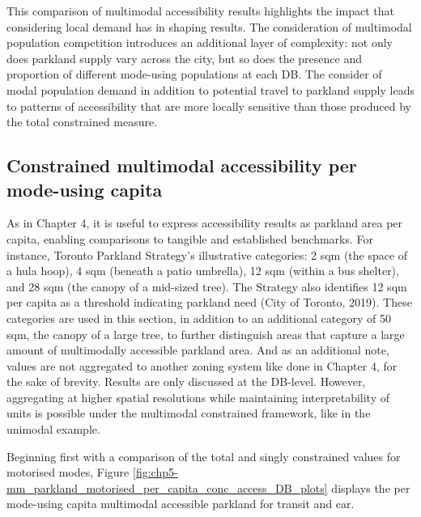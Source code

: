 \documentclass[
11pt, %
oneside, %
english, %
singlespacing, %
]{macthesis} %
\begin{document}
This comparison of multimodal accessibility results highlights the impact that considering local demand has in shaping results. The consideration of multimodal population competition introduces an additional layer of complexity: not only does parkland supply vary across the city, but so does the presence and proportion of different mode-using populations at each DB. The consider of modal population demand in addition to potential travel to parkland supply leads to patterns of accessibility that are more locally sensitive than those produced by the total constrained measure.

\subsection{Constrained multimodal accessibility per mode-using capita}\label{constrained-multimodal-accessibility-per-mode-using-capita}

As in Chapter 4, it is useful to express accessibility results as parkland area per capita, enabling comparisons to tangible and established benchmarks. For instance, Toronto Parkland Strategy's illustrative categories: 2 sqm (the space of a hula hoop), 4 sqm (beneath a patio umbrella), 12 sqm (within a bus shelter), and 28 sqm (the canopy of a mid-sized tree). The Strategy also identifies 12 sqm per capita as a threshold indicating parkland need (City of Toronto, 2019). These categories are used in this section, in addition to an additional category of 50 sqm, the canopy of a large tree, to further distinguish areas that capture a large amount of multimodally accessible parkland area. And as an additional note, values are not aggregated to another zoning system like done in Chapter 4, for the sake of brevity. Results are only discussed at the DB-level. However, aggregating at higher spatial resolutions while maintaining interpretability of units is possible under the multimodal constrained framework, like in the unimodal example.

Beginning first with a comparison of the total and singly constrained values for motorised modes, Figure \ref{fig:chp5-mm_parkland_motorised_per_capita_conc_access_DB_plots} displays the per mode-using capita multimodal accessible parkland for transit and car.
\end{document}

